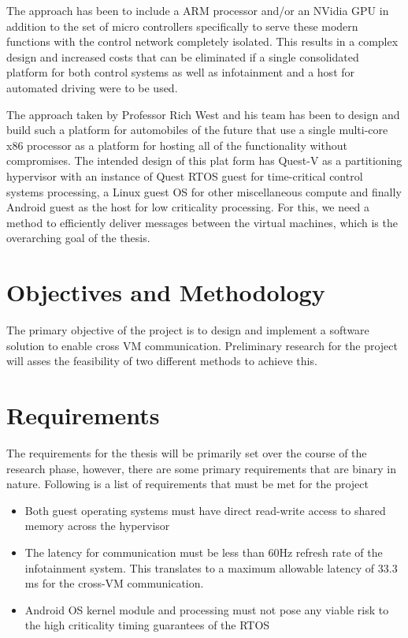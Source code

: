 \documentclass[12pt]{article}
\begin{document}
The approach has been to include a ARM processor and/or an NVidia GPU in addition to the set of micro controllers specifically to serve these modern functions with the control network completely isolated. This results in a complex design and increased costs that can be eliminated if a single consolidated platform for both control systems as well as infotainment and a host for automated driving were to be used.

The approach taken by Professor Rich West and his team has been to design and build such a platform for automobiles of the future that use a single multi-core x86 processor as a platform for hosting all of the functionality without compromises. The intended design of this plat form has Quest-V as a partitioning hypervisor with an instance of Quest RTOS guest for time-critical control systems processing, a Linux guest OS for other miscellaneous compute and finally Android guest as the host for low criticality processing. For this, we need a method to efficiently deliver messages between the virtual machines, which is the overarching goal of the thesis.


\section{Objectives and Methodology}
The primary objective of the project is to design and implement a software solution to enable cross VM communication. Preliminary research for the project will asses the feasibility of two different methods to achieve this. 


\section{Requirements}
The requirements for the thesis will be primarily set over the course of the research phase, however, there are some primary requirements that are binary in nature. Following is a list of requirements that must be met for the project
\begin{itemize}
	\item Both guest operating systems must have direct read-write access to shared memory across the hypervisor
	\item The latency for communication must be less than 60Hz refresh rate of the infotainment system. This translates to a maximum allowable latency of 33.3 ms for the cross-VM communication.
	\item Android OS kernel module and processing must not pose any viable risk to the high criticality timing guarantees of the RTOS
\end{itemize}
\end{document}
